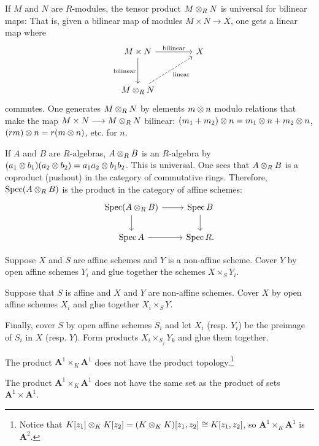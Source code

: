 \documentclass [11 pt, oneside] {article}
\begin{document}
If $M$ and $N$ are $R$-modules, the tensor product $M\otimes_R N$ is universal for bilinear maps: That is, given a bilinear map of modules $M\times N \longrightarrow X$, one gets a linear map where
\[
\begin{tikzcd}[column sep = 4 em, row sep = 3 em]
	M\times N \ar[r, "\textrm{bilinear}"]\ar[d,swap,"\textrm{bilinear}"]& X\\
	M\tensor_R N \ar[ur,swap,dashed,"\textrm{linear}"]
\end{tikzcd}
\]
commutes. One generates $M\otimes_R N$ by elements $m\otimes n$ modulo relations that make the map $M\times N \longrightarrow M\otimes_R N$ bilinear: $(m_1+m_2)\otimes n = m_1\otimes n + m_2\otimes n$, $(rm)\otimes n = r (m\otimes n)$, etc. for $n$. 

If $A$ and $B$ are $R$-algebras, $A\otimes_R B$ is an $R$-algebra by $(a_1\otimes b_1)(a_2\otimes b_2)=a_1a_2\otimes b_1b_2$. This is universal. One sees that $A\otimes_R B$ is a coproduct (pushout) in the category of commutative rings. Therefore, $\operatorname{Spec} (A\otimes_R B)$ is the product in the category of affine schemes:
\[
\begin{tikzcd}
	\Spec (A\tensor_R B)\ar[r]\ar[d] & \Spec B\ar[d]\\
	\Spec A\ar[r] &\Spec R.
\end{tikzcd}
\]

Suppose $X$ and $S$ are affine schemes and $Y$ is a non-affine scheme. Cover $Y$ by open affine schemes $Y_i$ and glue together the schemes $X\times_S Y_i$. 

Suppose that $S$ is affine and $X$ and $Y$ are non-affine schemes. Cover $X$ by open affine schemes $X_i$ and glue together $X_i \times_S Y$.

Finally, cover $S$ by open affine schemes $S_i$ and let $X_i$ (resp. $Y_i$) be the preimage of $S_i$ in $X$  (resp. $Y$). Form products $X_i\times_{S_j}Y_k$ and glue them together.

\begin{remark}
	The product $\mathbf{A}^1\times_K \mathbf{A}^1$ does not have the product topology.\footnote{Notice that $K[z_1]\otimes_K K[z_2] = (K\otimes_KK) [ z_1,z_2] \cong K[z_1,z_2]$, so $\mathbf{A}^1\times_K \mathbf{A}^1$ is $\mathbf{A}^2$.}
\end{remark}

\begin{remark}
	The product $\mathbf{A}^1\times_K\mathbf{A}^1$ does not have the same set as the product of sets $\mathbf{A}^1\times \mathbf{A}^1$.
\end{remark}
\end{document}

